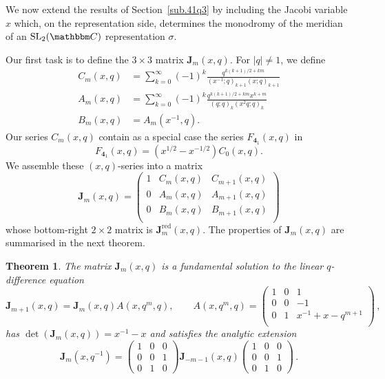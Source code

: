 \documentclass[12pt,reqno]{amsart}
\newtheorem{theorem}{Theorem}
\theoremstyle{definition}
\def\BC{\mathbbm C}
\def\s{\sigma}
\def\SL{\mathrm{SL}}
\def\be{\begin{equation}}
\def\ee{\end{equation}}
\def\bJ{\mathbf J}
\def\RED{\mathrm{red}}
\def\md{\mathbf}
\newcommand{\knot}[1]{\md{#1}}
\begin{document}

We now extend the results of Section~\ref{sub.41q3} by including the Jacobi
variable $x$ which, on the representation side, determines the monodromy of the
meridian of an $\SL_2(\BC)$ representation $\s$. 

Our first task is to define the $3 \times 3$ matrix $\bJ_{m}(x,q)$.
For $|q| \neq 1$, we define
\be
\label{ABC}
\begin{aligned}
  C_{m}(x,q) &=
  \sum_{k=0}^{\infty}(-1)^{k}\frac{q^{k(k+1)/2+km}}{(x^{-1};q)_{k+1}(x;q)_{k+1}}
\\
A_{m}(x,q) &=
\sum_{k=0}^{\infty}(-1)^{k}\frac{q^{k(k+1)/2+km}x^{k+m}}{(q;q)_{k}(x^{2}q;q)_{k}}
\\
B_{m}(x,q) &=A_{m}(x^{-1},q).
\end{aligned}
\ee
Our series $C_m(x,q)$ contain as a special case the series
$F_{\knot{4}_1}(x,q)$ in \cite{Gukov-Manolescu,Park:2020edg,park-inverted}
\begin{equation}
  F_{\knot{4}_1}(x,q) = (x^{1/2}-x^{-1/2}) C_0(x,q).
  \label{eq:FK}
\end{equation}
We assemble these $(x,q)$-series into a matrix
\begin{equation}
\bJ_{m}(x,q)
=
\begin{pmatrix}
1 & C_{m}(x,q) & C_{m+1}(x,q)\\
0 & A_{m}(x,q) & A_{m+1}(x,q)\\
0 & B_{m}(x,q) & B_{m+1}(x,q)\\
\end{pmatrix}
\end{equation}
whose bottom-right $2 \times 2$ matrix is $\bJ^\RED_{m}(x,q)$. The properties of
$\bJ_{m}(x,q)$ are summarised in the next theorem.
\begin{theorem}
\label{thm.41bJx1}
  The matrix $\bJ_{m}(x,q)$ is a fundamental solution to the linear $q$-difference
  equation
\be
\label{41Jxqrec}
\bJ_{m+1}(x,q) = \bJ_{m}(x,q) A(x,q^m,q), \qquad A(x,q^m,q)=
\begin{pmatrix}
1 & 0 & 1\\
0 & 0 & -1\\
0 & 1 & x^{-1}+x-q^{m+1}\\
\end{pmatrix} \,,
\ee
has $\det(\bJ_m(x,q))=x^{-1}-x$ and satisfies the analytic extension 
\begin{equation}
\label{Jmxqq}  
  \bJ_m(x,q^{-1}) =
  \begin{pmatrix}
    1&0&0\\
    0&0&1\\
    0&1&0
  \end{pmatrix} \bJ_{-m-1}(x,q)
  \begin{pmatrix}
    1&0&0\\
    0&0&1\\
    0&1&0
  \end{pmatrix}  \,.
\end{equation}
\end{theorem}
\end{document}
